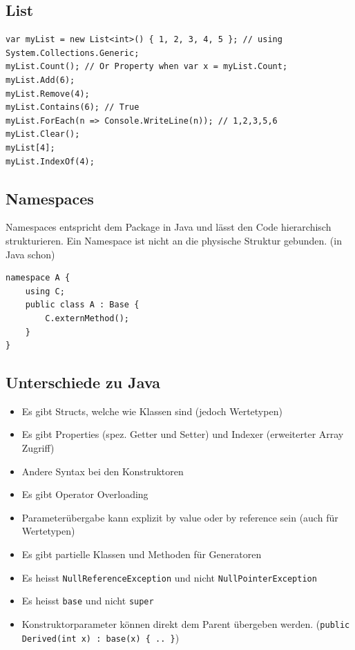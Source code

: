 \documentclass[
a4paper,
oneside,
10pt,
fleqn,
headsepline,
toc=listofnumbered, 
bibliography=totocnumbered]{scrartcl}
\begin{document}
\subsection{List}
\begin{lstlisting}
var myList = new List<int>() { 1, 2, 3, 4, 5 }; // using System.Collections.Generic;
myList.Count(); // Or Property when var x = myList.Count;
myList.Add(6);
myList.Remove(4);
myList.Contains(6); // True
myList.ForEach(n => Console.WriteLine(n)); // 1,2,3,5,6
myList.Clear();
myList[4];
myList.IndexOf(4);
\end{lstlisting}


\subsection{Namespaces}
Namespaces entspricht dem Package in Java und lässt den Code hierarchisch strukturieren. Ein Namespace ist nicht an die physische Struktur gebunden. (in Java schon)
\begin{lstlisting}
namespace A {
	using C;
	public class A : Base {
		C.externMethod();
	}
}
\end{lstlisting}

\subsection{Unterschiede zu Java}

\begin{itemize}
	\item Es gibt Structs, welche wie Klassen sind (jedoch Wertetypen)
	\item Es gibt Properties (spez. Getter und Setter) und Indexer (erweiterter Array Zugriff)
	\item Andere Syntax bei den Konstruktoren
	\item Es gibt Operator Overloading
	\item Parameterübergabe kann explizit by value oder by reference sein (auch für Wertetypen)
	\item Es gibt partielle Klassen und Methoden für Generatoren
	\item Es heisst \lstinline|NullReferenceException| und nicht \lstinline|NullPointerException|
	\item Es heisst \lstinline|base| und nicht \lstinline|super|
	\item Konstruktorparameter können direkt dem Parent übergeben werden. (\lstinline|public Derived(int x) : base(x) { .. }|)
\end{itemize}
\end{document}
